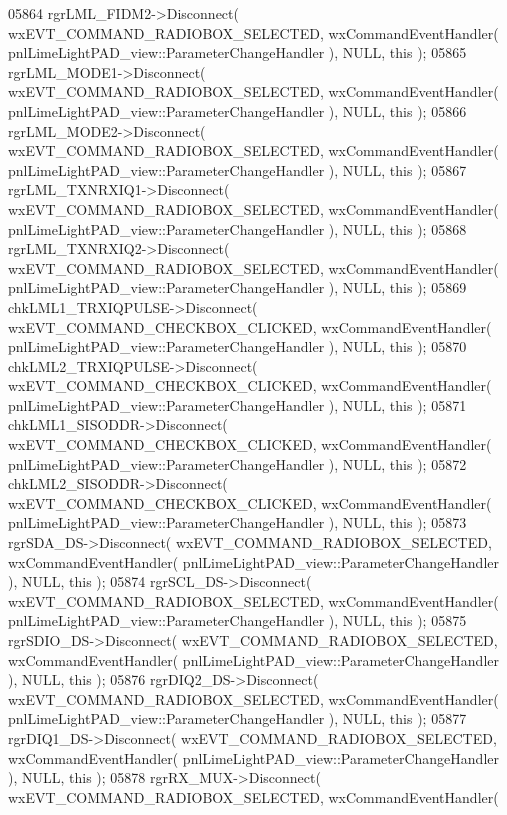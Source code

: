 \begin{DoxyCode}
05864     rgrLML_FIDM2->Disconnect( wxEVT\_COMMAND\_RADIOBOX\_SELECTED, wxCommandEventHandler( 
      pnlLimeLightPAD_view::ParameterChangeHandler ), NULL, \textcolor{keyword}{this} );
05865     rgrLML_MODE1->Disconnect( wxEVT\_COMMAND\_RADIOBOX\_SELECTED, wxCommandEventHandler( 
      pnlLimeLightPAD_view::ParameterChangeHandler ), NULL, \textcolor{keyword}{this} );
05866     rgrLML_MODE2->Disconnect( wxEVT\_COMMAND\_RADIOBOX\_SELECTED, wxCommandEventHandler( 
      pnlLimeLightPAD_view::ParameterChangeHandler ), NULL, \textcolor{keyword}{this} );
05867     rgrLML_TXNRXIQ1->Disconnect( wxEVT\_COMMAND\_RADIOBOX\_SELECTED, wxCommandEventHandler( 
      pnlLimeLightPAD_view::ParameterChangeHandler ), NULL, \textcolor{keyword}{this} );
05868     rgrLML_TXNRXIQ2->Disconnect( wxEVT\_COMMAND\_RADIOBOX\_SELECTED, wxCommandEventHandler( 
      pnlLimeLightPAD_view::ParameterChangeHandler ), NULL, \textcolor{keyword}{this} );
05869     chkLML1_TRXIQPULSE->Disconnect( wxEVT\_COMMAND\_CHECKBOX\_CLICKED, wxCommandEventHandler( 
      pnlLimeLightPAD_view::ParameterChangeHandler ), NULL, \textcolor{keyword}{this} );
05870     chkLML2_TRXIQPULSE->Disconnect( wxEVT\_COMMAND\_CHECKBOX\_CLICKED, wxCommandEventHandler( 
      pnlLimeLightPAD_view::ParameterChangeHandler ), NULL, \textcolor{keyword}{this} );
05871     chkLML1_SISODDR->Disconnect( wxEVT\_COMMAND\_CHECKBOX\_CLICKED, wxCommandEventHandler( 
      pnlLimeLightPAD_view::ParameterChangeHandler ), NULL, \textcolor{keyword}{this} );
05872     chkLML2_SISODDR->Disconnect( wxEVT\_COMMAND\_CHECKBOX\_CLICKED, wxCommandEventHandler( 
      pnlLimeLightPAD_view::ParameterChangeHandler ), NULL, \textcolor{keyword}{this} );
05873     rgrSDA_DS->Disconnect( wxEVT\_COMMAND\_RADIOBOX\_SELECTED, wxCommandEventHandler( 
      pnlLimeLightPAD_view::ParameterChangeHandler ), NULL, \textcolor{keyword}{this} );
05874     rgrSCL_DS->Disconnect( wxEVT\_COMMAND\_RADIOBOX\_SELECTED, wxCommandEventHandler( 
      pnlLimeLightPAD_view::ParameterChangeHandler ), NULL, \textcolor{keyword}{this} );
05875     rgrSDIO_DS->Disconnect( wxEVT\_COMMAND\_RADIOBOX\_SELECTED, wxCommandEventHandler( 
      pnlLimeLightPAD_view::ParameterChangeHandler ), NULL, \textcolor{keyword}{this} );
05876     rgrDIQ2_DS->Disconnect( wxEVT\_COMMAND\_RADIOBOX\_SELECTED, wxCommandEventHandler( 
      pnlLimeLightPAD_view::ParameterChangeHandler ), NULL, \textcolor{keyword}{this} );
05877     rgrDIQ1_DS->Disconnect( wxEVT\_COMMAND\_RADIOBOX\_SELECTED, wxCommandEventHandler( 
      pnlLimeLightPAD_view::ParameterChangeHandler ), NULL, \textcolor{keyword}{this} );
05878     rgrRX_MUX->Disconnect( wxEVT\_COMMAND\_RADIOBOX\_SELECTED, wxCommandEventHandler( 

\end{DoxyCode}
